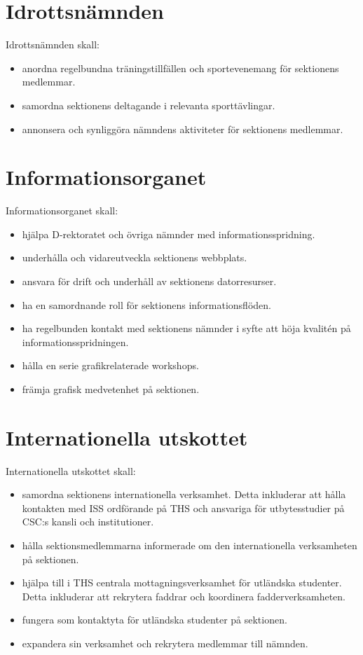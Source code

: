 \documentclass{dgovdoc}
\begin{document}
\section{Idrottsnämnden}
Idrottsnämnden skall:
\begin{itemize}
\item anordna regelbundna träningstillfällen och sportevenemang för sektionens medlemmar.
\item samordna sektionens deltagande i relevanta sporttävlingar.
\item annonsera och synliggöra nämndens aktiviteter för sektionens medlemmar.
\end{itemize}

\section{Informationsorganet}
Informationsorganet skall:
\begin{itemize}
\item hjälpa D-rektoratet och övriga nämnder med informationsspridning.
\item underhålla och vidareutveckla sektionens webbplats.
\item ansvara för drift och underhåll av sektionens datorresurser.
\item ha en samordnande roll för sektionens informationsflöden.
\item ha regelbunden kontakt med sektionens nämnder i syfte att höja kvalitén på informationsspridningen.
\item hålla en serie grafikrelaterade workshops.
\item främja grafisk medvetenhet på sektionen.
\end{itemize}

\section{Internationella utskottet}
Internationella utskottet skall:
\begin{itemize}
\item samordna sektionens internationella verksamhet. Detta inkluderar att hålla kontakten med ISS ordförande på THS och ansvariga för utbytesstudier på CSC:s kansli och institutioner.
\item hålla sektionsmedlemmarna informerade om den internationella verksamheten på sektionen.
\item hjälpa till i THS centrala mottagningsverksamhet för utländska studenter. Detta inkluderar att rekrytera faddrar och koordinera fadderverksamheten.
\item fungera som kontaktyta för utländska studenter på sektionen.
\item expandera sin verksamhet och rekrytera medlemmar till nämnden.
\end{itemize}
\end{document}
